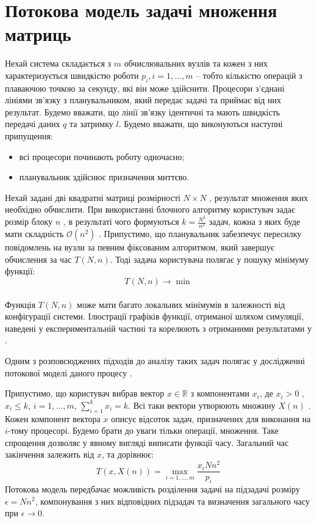 
\section{Потокова модель задачі множення матриць}

Нехай система складається з $m$ обчислювальних вузлів та кожен з них характеризується швидкістю роботи $p_i , i=1,\ldots,m$ – тобто кількістю операцій з плаваючою точкою за секунду, які він може здійснити. Процесори з’єднані лініями зв’язку з планувальником, який передає задачі та приймає від них результат. Будемо вважати, що лінії зв’язку ідентичні та мають швидкість передачі даних $q$ та затримку $l$.
Будемо вважати, що виконуються наступні припущення:
\begin{itemize}
	\item всі процесори починають роботу одночасно;
	\item планувальник здійснює призначення миттєво.
\end{itemize}

Нехай задані дві квадратні матриці розмірності $N \times N$ , результат множення яких необхідно обчислити. При використанні блочного алгоритму користувач задає розмір блоку $n$ , в результаті чого формуються $k=\frac{N^2}{n^2}$  задач, кожна з яких буде мати складність $\mathcal{O}(n^2)$ . Припустимо, що планувальник забезпечує пересилку повідомлень на вузли за певним фіксованим алгоритмом, який завершує обчислення за час $T(N,n)$. Тоді задача користувача полягає у пошуку мінімуму функції:
\begin{equation}
	\label{eq:general_minimization_problem}
	T(N,n) \longrightarrow \min
\end{equation}
\\
Функція $T(N,n)$ може мати багато локальних мінімумів в залежності від конфігурації системи. Ілюстрації графіків функції, отриманої шляхом симуляції, наведені у експериментальній частині та корелюють з отриманими результатами у \cite{DoroshenkoIgnatenkoIvanenko}.

Одним з розповсюджених підходів до аналізу таких задач полягає у дослідженні потокової моделі даного процесу \cite{FluidModelForJobScheduling}.

Припустимо, що користувач вибрав вектор $x \in \mathbb{R}$ з компонентами $x_i$, де $x_i > 0$ , $x_i \le k$, $i=1,\ldots,m$, $\sum_{i=1}^{k}x_i = k$. Всі таки вектори утворюють множину $X(n)$ . Кожен компонент вектора $x$ описує відсоток задач, призначених для виконання на  $i$-тому процесорі. Будемо брати до уваги тільки операції, множення. Таке спрощення дозволяє у явному вигляді виписати функції часу. Загальний час закінчення залежить від  $x$, та дорівнює:
\begin{equation}
	\label{eq:total_time_general}
	T(x,X(n)) = \max\limits_{i=1,\ldots,m}{\frac{x_i N n^2}{p_i}}
\end{equation}
Потокова модель передбачає можливість розділення задачі на підзадачі розміру $\epsilon = N n^2$, компонування з них відповідних підзадач та визначення загального часу при  $\epsilon \longrightarrow 0$.


